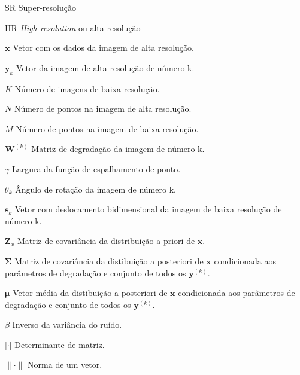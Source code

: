 \documentclass[12pt,openright,oneside,a4paper,english,brazil]{abntex2}
\begin{document}
\begin{siglas}
	\item[SR] Super-resolução
	\item[HR] \textit{High resolution} ou alta resolução
\end{siglas}

\begin{simbolos}
	\item[$ \mathbf{x} $] Vetor com os dados da imagem de alta resolução.
	\item[$ \mathbf{y}_k $] Vetor da imagem de alta resolução de número k.
	\item[$ K $] Número de imagens de baixa resolução.
	\item[$ N $] Número de pontos na imagem de alta resolução.
    \item[$ M $] Número de pontos na imagem de baixa resolução.
    \item[$ \mathbf{W}^{(k)}$] Matriz de degradação da imagem de número k.
    \item[$ \gamma $] Largura da função de espalhamento de ponto.
    \item[$ \theta_k $] Ângulo de rotação da imagem de número k.
    \item[$ \mathbf{s}_k $] Vetor com deslocamento bidimensional da imagem de baixa resolução de número k.
    \item[$ \mathbf{Z}_x $] Matriz de covariância da distribuição a priori de $\mathbf{x}$.
    \item[$ \mathbf{\Sigma}$] Matriz de covariância da distibuição a posteriori de $\mathbf{x}$ condicionada aos parâmetros de degradação e conjunto de todos os $\mathbf{y}^{(k)}$.
    \item[$ \boldsymbol{\mu} $] Vetor média da distibuição a posteriori de $\mathbf{x}$ condicionada aos parâmetros de degradação e conjunto de todos os $\mathbf{y}^{(k)}$.
    \item[$ \beta $] Inverso da variância do ruído.
    \item[$ | \cdot | $] Determinante de matriz.
    \item[$\| \cdot \|$] Norma de um vetor.
    
\end{simbolos}

\tableofcontents*
\cleardoublepage
\end{document}
